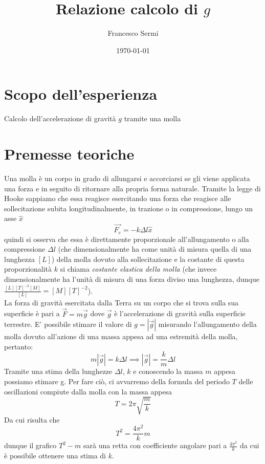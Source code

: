 \documentclass{article}
\title{Relazione calcolo di $g$}
\author{Francesco Sermi}
\date{\today}
\begin{document}
	\maketitle
	\section{Scopo dell'esperienza}
	Calcolo dell'accelerazione di gravità $g$ tramite una molla
	\section{Premesse teoriche}
	Una molla è un corpo in grado di allungarsi e accorciarsi se gli viene applicata una forza e in seguito di ritornare alla propria forma naturale. Tramite la legge di Hooke sappiamo che essa reagisce esercitando una forza che reagisce alle sollecitazione subita longitudinalmente, in trazione o in compressione, lungo un asse $\hat{x}$
	\begin{equation}
	\vec{F_e} = - k \Delta l \hat{x}
	\end{equation}
	quindi si osserva che essa è direttamente proporzionale all'allungamento o alla compressione $\Delta l$ (che dimensionalmente ha come unità di misura quella di una lunghezza $[L]$) della molla dovuto alla sollecitazione e la costante di questa proporzionalità $k$ si chiama \emph{costante elastica della molla} (che invece dimensionalmente ha l'unità di misura di una forza diviso una lunghezza, dunque $\frac{[L][T]^{-2}[M]}{[L]} = [M][T]^{-2}$). \\
	La forza di gravità esercitata dalla Terra su un corpo che si trova sulla sua superficie è pari a
	$\vec{F} = m\vec{g}$
	dove $\vec{g}$ è l'accelerazione di gravità sulla superficie terrestre. E' possibile stimare il valore di $g=|\vec{g}|$ misurando l'allungamento della molla dovuto all'azione di una massa appesa ad una estremità della molla, pertanto:
	\begin{equation}
		m|\vec{g}| = k \Delta l \implies |\vec{g}| = \frac{k}{m} \Delta l
		\label{secondo_modello}
	\end{equation}
	Tramite una stima della lunghezze $\Delta l$, $k$ e conoscendo la  massa $m$ appesa possiamo stimare g. Per fare ciò, ci avvarremo della formula del periodo $T$ delle oscillazioni compiute dalla molla con la massa appesa
	\begin{equation}
		T = 2 \pi \sqrt{\frac{m}{k}}
	\end{equation}
	Da cui risulta che 
	\begin{equation}
	T^2 = \frac{4\pi^2}{k} m
	\label{primo_modello}
	\end{equation}
	dunque il grafico $T^2 - m$ sarà una retta con coefficiente angolare pari a $\frac{4\pi^2}{k}$ da cui è possibile ottenere una stima di $k$.
\end{document}
